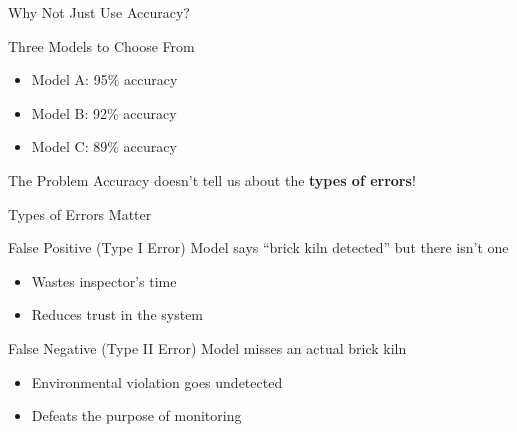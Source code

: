 \documentclass{beamer}
\begin{document}
\begin{frame}{Why Not Just Use Accuracy?}
\begin{alertblock}{Three Models to Choose From}
\small
\begin{itemize}
    \item Model A: 95\% accuracy
    \item Model B: 92\% accuracy
    \item Model C: 89\% accuracy
\end{itemize}
\end{alertblock}

\vspace{0.2cm}
\pause

\begin{keypointsbox}{The Problem}
\small
Accuracy doesn't tell us about the \textbf{types of errors}!
\end{keypointsbox}
\end{frame}

\begin{frame}{Types of Errors Matter}
\begin{examplebox}{False Positive (Type I Error)}
\small
Model says ``brick kiln detected'' but there isn't one
\begin{itemize}
    \item Wastes inspector's time
    \item Reduces trust in the system
\end{itemize}
\end{examplebox}

\vspace{0.15cm}

\begin{examplebox}{False Negative (Type II Error)}
\small
Model misses an actual brick kiln
\begin{itemize}
    \item Environmental violation goes undetected
    \item Defeats the purpose of monitoring
\end{itemize}
\end{examplebox}
\end{frame}
\end{document}
